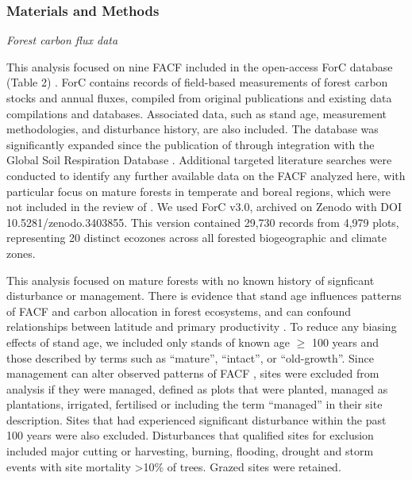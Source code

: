 \documentclass[]{article}
\begin{document}
\subsubsection{Materials and Methods}\label{materials-and-methods}

\emph{Forest carbon flux data}

This analysis focused on nine FACF included in the open-access ForC
database (Table 2)
\citep{anderson-teixeira_carbon_2016, anderson-teixeira_forc_2018}. ForC
contains records of field-based measurements of forest carbon stocks and
annual fluxes, compiled from original publications and existing data
compilations and databases. Associated data, such as stand age,
measurement methodologies, and disturbance history, are also included.
The database was significantly expanded since the publication of
\citet{anderson-teixeira_forc_2018} through integration with the Global
Soil Respiration Database \citep{bond-lamberty_global_2010}. Additional
targeted literature searches were conducted to identify any further
available data on the FACF analyzed here, with particular focus on
mature forests in temperate and boreal regions, which were not included
in the review of \citet{anderson-teixeira_carbon_2016}. We used ForC
v3.0, archived on Zenodo with DOI 10.5281/zenodo.3403855. This version
contained 29,730 records from 4,979 plots, representing 20 distinct
ecozones across all forested biogeographic and climate zones.

This analysis focused on mature forests with no known history of
signficant disturbance or management. There is evidence that stand age
influences patterns of FACF and carbon allocation in forest ecosystems,
and can confound relationships between latitude and primary productivity
\citep{delucia_forest_2007, gillman_latitude_2015}. To reduce any
biasing effects of stand age, we included only stands of known age
\(\ge\) 100 years and those described by terms such as ``mature'',
``intact'', or ``old-growth''. Since management can alter observed
patterns of FACF \citep{simova_enigma_2017}, sites were excluded from
analysis if they were managed, defined as plots that were planted,
managed as plantations, irrigated, fertilised or including the term
``managed'' in their site description. Sites that had experienced
significant disturbance within the past 100 years were also excluded.
Disturbances that qualified sites for exclusion included major cutting
or harvesting, burning, flooding, drought and storm events with site
mortality \textgreater{}10\% of trees. Grazed sites were retained.
\end{document}
